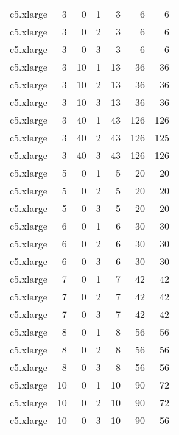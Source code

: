\begin{tabular}{lrrrrrr}
c5.xlarge & 3 & 0 & 1 & 3 & 6 & 6 \\
c5.xlarge & 3 & 0 & 2 & 3 & 6 & 6 \\
c5.xlarge & 3 & 0 & 3 & 3 & 6 & 6 \\
c5.xlarge & 3 & 10 & 1 & 13 & 36 & 36 \\
c5.xlarge & 3 & 10 & 2 & 13 & 36 & 36 \\
c5.xlarge & 3 & 10 & 3 & 13 & 36 & 36 \\
c5.xlarge & 3 & 40 & 1 & 43 & 126 & 126 \\
c5.xlarge & 3 & 40 & 2 & 43 & 126 & 125 \\
c5.xlarge & 3 & 40 & 3 & 43 & 126 & 126 \\
c5.xlarge & 5 & 0 & 1 & 5 & 20 & 20 \\
c5.xlarge & 5 & 0 & 2 & 5 & 20 & 20 \\
c5.xlarge & 5 & 0 & 3 & 5 & 20 & 20 \\
c5.xlarge & 6 & 0 & 1 & 6 & 30 & 30 \\
c5.xlarge & 6 & 0 & 2 & 6 & 30 & 30 \\
c5.xlarge & 6 & 0 & 3 & 6 & 30 & 30 \\
c5.xlarge & 7 & 0 & 1 & 7 & 42 & 42 \\
c5.xlarge & 7 & 0 & 2 & 7 & 42 & 42 \\
c5.xlarge & 7 & 0 & 3 & 7 & 42 & 42 \\
c5.xlarge & 8 & 0 & 1 & 8 & 56 & 56 \\
c5.xlarge & 8 & 0 & 2 & 8 & 56 & 56 \\
c5.xlarge & 8 & 0 & 3 & 8 & 56 & 56 \\
c5.xlarge & 10 & 0 & 1 & 10 & 90 & 72 \\
c5.xlarge & 10 & 0 & 2 & 10 & 90 & 72 \\
c5.xlarge & 10 & 0 & 3 & 10 & 90 & 56 \\
\bottomrule
\end{tabular}
